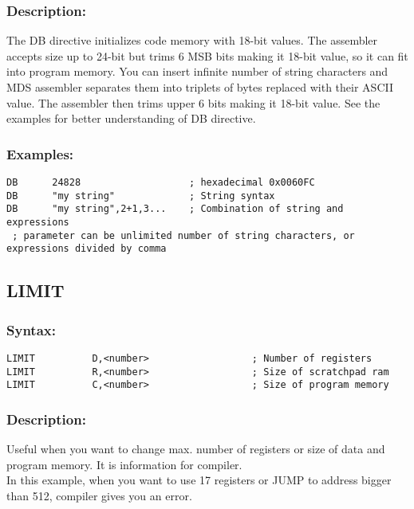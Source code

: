         \subsubsection{Description:}
            The DB directive initializes code memory with 18-bit values. The assembler accepts size up to 24-bit but trims 6 MSB bits making it 18-bit value,
            so it can fit into program memory. You can insert infinite number of string characters and MDS assembler separates them into triplets of bytes replaced
            with their ASCII value. The assembler then trims upper 6 bits making it 18-bit value.
            See the examples for better understanding of DB directive.

        \subsubsection{Examples:}
        {
            \usecodefont
            \verb'DB      24828                   ; hexadecimal 0x0060FC'\\
            \verb'DB      "my string"             ; String syntax'\\
            \verb'DB      "my string",2+1,3...    ; Combination of string and expressions'\\
            \verb' ; parameter can be unlimited number of string characters, or expressions divided by comma'\\
        }
    \subsection{LIMIT}

        \subsubsection{Syntax:}
        \verb'LIMIT          D,<number>                  ; Number of registers '\\
        \verb'LIMIT          R,<number>                  ; Size of scratchpad ram '\\
        \verb'LIMIT          C,<number>                  ; Size of program memory '\\

        \subsubsection{Description:}
        Useful when you want to change max. number of registers or size of  data and program memory. It is information for compiler.\\
        In this example, when you want to use 17 registers or JUMP to address bigger than 512, compiler gives you an error.

